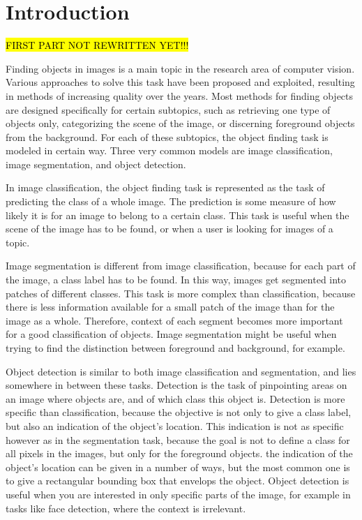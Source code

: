 \chapter{Introduction} %
\label{sec:introduction}
\hl{FIRST PART NOT REWRITTEN YET!!!}

Finding objects in images is a main topic in the research area of computer vision. Various approaches to solve this task have been proposed and exploited, resulting in methods of increasing quality over the years. Most methods for finding objects are designed specifically for certain subtopics, such as retrieving one type of objects only, categorizing the scene of the image, or discerning foreground objects from the background. For each of these subtopics, the object finding task is modeled in certain way. Three very common models are image classification, image segmentation, and object detection.

In image classification, the object finding task is represented as the task of predicting the class of a whole image. The prediction is some measure of how likely it is for an image to belong to a certain class. This task is useful when the scene of the image has to be found, or when a user is looking for images of a topic.

Image segmentation is different from image classification, because for each part of the image, a class label has to be found. In this way, images get segmented into patches of different classes. This task is more complex than classification, because there is less information available for a small patch of the image than for the image as a whole. Therefore, context of each segment becomes more important for a good classification of objects. Image segmentation might be useful when trying to find the distinction between foreground and background, for example.

Object detection is similar to both image classification and segmentation, and lies somewhere in between these tasks. Detection is the task of pinpointing areas on an image where objects are, and of which class this object is. Detection is more specific than classification, because the objective is not only to give a class label, but also an indication of the object's location. This indication is not as specific however as in the segmentation task, because the goal is not to define a class for all pixels in the images, but only for the foreground objects. the indication of the object's location can be given in a number of ways, but the most common one is to give a rectangular bounding box that envelops the object. \cite{pascal-voc-2007} Object detection is useful when you are interested in only specific parts of the image, for example in tasks like face detection, where the context is irrelevant. 

